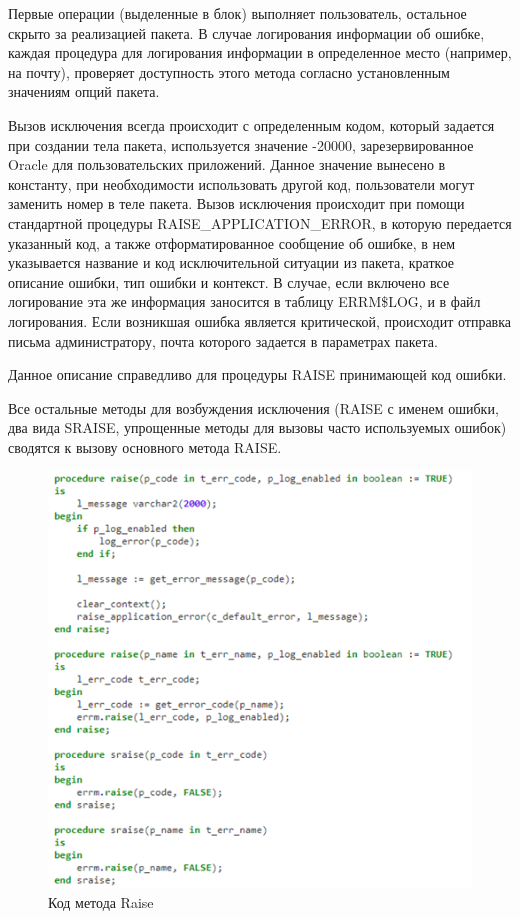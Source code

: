 Первые операции (выделенные в блок) выполняет пользователь, остальное скрыто за реализацией пакета. В случае логирования информации об ошибке, каждая процедура для логирования информации в определенное место (например, на почту), проверяет доступность этого метода согласно установленным значениям опций пакета. 

Вызов исключения всегда происходит с определенным кодом, который задается при создании тела пакета, используется значение -20000, зарезервированное Oracle для пользовательских приложений. Данное значение вынесено в константу, при необходимости использовать другой код, пользователи могут заменить номер в теле пакета. Вызов исключения происходит при помощи стандартной процедуры RAISE\_APPLICATION\_ERROR, в которую передается указанный код, а также отформатированное сообщение об ошибке, в нем указывается название и код исключительной ситуации из пакета, краткое описание ошибки, тип ошибки и контекст. В случае, если включено все логирование эта же информация заносится в таблицу ERRM\$LOG, и в файл логирования. Если возникшая ошибка является критической, происходит отправка письма администратору, почта которого задается в параметрах пакета. 

Данное описание справедливо для процедуры RAISE принимающей код ошибки. 

Все остальные методы для возбуждения исключения (RAISE с именем ошибки, два вида SRAISE, упрощенные методы для вызовы часто используемых ошибок) сводятся к вызову основного метода RAISE.

\begin{figure}[ht!] 
	\center
	\includegraphics [scale=1] {my_folder/img/c3_raise_code.png}
	\caption{Код метода Raise} 
	\label{fig:c3_raise_code}  
\end{figure}
\FloatBarrier

